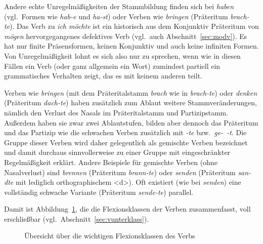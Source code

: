 Andere echte Unregelmäßigkeiten der Stammbildung finden sich bei \textit{haben} (vgl.\ Formen wie \textit{hab-e} und \textit{ha-st}) oder Verben wie \textit{bringen} (Präteritum \textit{brach-te}).
\label{abs:9z32fqgsve}Das Verb zu \textit{ich möchte} ist ein historisch aus dem Konjunktiv Präteritum von \textit{mögen} hervorgegangenes defektives Verb (vgl.\ auch Abschnitt~\ref{sec:modv}).
Es hat nur finite Präsensformen, keinen Konjunktiv und auch keine infiniten Formen.
Von Unregelmäßigkeit lohnt es sich also nur zu sprechen, wenn wie in diesen Fällen ein Verb (oder ganz allgemein ein Wort) zumindest partiell ein grammatisches Verhalten zeigt, das es mit keinem anderen teilt.


Verben wie \textit{bringen} (mit dem Präteritalstamm \textit{brach} wie in \textit{brach-te}) oder \textit{denken} (Präteritum \textit{dach-te}) haben zusätzlich zum Ablaut weitere Stammveränderungen, nämlich den Verlust des Nasals im Präteritalstamm und Partizipstamm.
Außerdem haben sie zwar zwei Ablautstufen, bilden aber dennoch das Präteritum und das Partizip wie die schwachen Verben zusätzlich mit \textit{-te} bzw.\ \textit{ge-~-t}.
Die Gruppe dieser Verben wird daher gelegentlich als gemischte Verben bezeichnet und damit durchaus sinnvollerweise zu einer Gruppe mit eingeschränkter Regelmäßigkeit erklärt.
Andere Beispiele für gemischte Verben (ohne Nasalverlust) sind \textit{brennen} (Präteritum \textit{brann-te}) oder \textit{senden} (Präteritum \textit{san-dte} mit lediglich orthographischem <d>).
Oft existiert (wie bei \textit{senden}) eine vollständig schwache Variante (Präteritum \textit{sende-te}) parallel.

Damit ist Abbildung~\ref{fig:vflexklassen}, die die Flexionsklassen der Verben zusammenfasst, voll erschließbar (vgl.\ Abschnitt~\ref{sec:vunterklass}).

\begin{figure}
  \caption{Übersicht über die wichtigen Flexionsklassen des Verbs}
  \label{fig:vflexklassen}
\end{figure}

